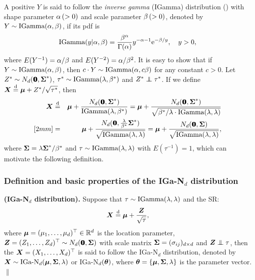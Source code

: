A positive \trv $Y$ is said to follow the \textit{inverse gamma} (IGamma) distribution (\cite{JKB1994}) with shape parameter $\alpha \, (>0)$ and scale parameter $\beta \, (>0)$, denoted by $Y \sim \mbox{IGamma}(\alpha, \beta)$, if its pdf is
$$
    \mbox{IGamma}(y | \alpha, \beta) = \frac{\beta^\alpha}{\Gamma(\alpha)} y^{-\alpha - 1} {\rm e}^{-\beta / y}, \quad y > 0,
$$
where $E(Y^{-1}) = \alpha / \beta$ and $E(Y^{-2}) = \alpha / \beta^2$. It is easy to show that if $Y \sim \mbox{IGamma}(\alpha, \beta)$, then $c \cdot Y \sim \mbox{IGamma}(\alpha, c\beta)$ for any constant $c > 0$. Let $Z^* \sim N_d({\bf 0}\!\!\!{\bf 0}, {\mbox{\boldmath$\Sigma$}}^*)$, $\tau^* \sim \mbox{IGamma}(\lambda, \beta^*)$ and $Z^* \inde \tau^*$. If we define ${\boldsymbol{X}} \stackrel{{\rm d}}{=} {\boldsymbol{\mu}} + Z^* / \sqrt{\tau^*}$, then
\begin{eqnarray*}
    \ibX &\sd& \bmu + \frac{N_d(\0, \bSi^*)}{\IGamma(\la, \be^*)} = \bmu + \frac{N_d(\0, \bSi^*)}{\sqrt{\be^* / \la \cdot \IGamma(\la, \la)}} \\ [2mm]
    &=& \bmu + \frac{N_d(\0, \frac{\la}{\be^*} \bSi^*)}{\sqrt{\IGamma(\la, \la)}} = \bmu + \frac{N_d(\0, \bSi)}{\sqrt{\IGamma(\la, \la)}},
\end{eqnarray*}
where ${\mbox{\boldmath$\Sigma$}} = \lambda {\mbox{\boldmath$\Sigma$}}^* / \beta^*$ and $\tau \sim \mbox{IGamma}(\lambda, \lambda)$ with $E(\tau^{-1}) = 1$, which can motivate the following definition.

\subsubsection{Definition and basic properties of the IGa-N$_d$ distribution}        %

\begin{definition}{\rm \textbf{(IGa-N$_d$ distribution).} Suppose that $\tau \sim \mbox{IGamma}(\lambda, \lambda)$ and the SR:
$$
    {\boldsymbol{X}} \stackrel{{\rm d}}{=} {\boldsymbol{\mu}} + \frac{{\boldsymbol{Z}}}{\sqrt{\tau}}, 
$$
where ${\boldsymbol{\mu}} = (\mu_1, \dots, \mu_d)^\top \in {\mathbb{R}}^d$ is the location parameter, ${\boldsymbol{Z}} = (Z_1, \dots, Z_d)^\top \sim N_d({\bf 0}\!\!\!{\bf 0}, {\mbox{\boldmath$\Sigma$}})$ with scale matrix ${\mbox{\boldmath$\Sigma$}} = (\sigma_{ij})_{d\times d}$ and $\ibZ \inde \tau$, then the \trv ${\boldsymbol{X}} = (X_1, \dots, X_d)^\top$ is said to follow the IGa-N$_d$ distribution, denoted by ${\boldsymbol{X}} \sim \mbox{IGa-N}_d({\boldsymbol{\mu}}, {\mbox{\boldmath$\Sigma$}}, \lambda)$ or IGa-N$_d({\boldsymbol{\theta}})$, where ${\boldsymbol{\theta}} = \{{\boldsymbol{\mu}}, {\mbox{\boldmath$\Sigma$}}, \lambda\}$ is the parameter vector. \hfill $\|$
}\end{definition}


